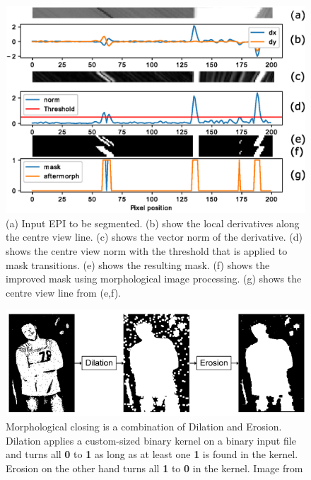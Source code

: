 \documentclass  [
  paper    = a4,
  BCOR     = 10mm,
  twoside,
  fontsize = 12pt,
  fleqn,
  toc      = bibnumbered,
  toc      = listofnumbered,
  numbers  = noendperiod,
  headings = normal,
  listof   = leveldown,
  version  = 3.03
]                                       {scrreprt}
\begin{document}
\begin{figure}
	\centering
	\includegraphics[width=1\linewidth]{images/derivatives_full}
	\caption[Segmenting an EPI]{(a) Input EPI to be segmented. (b) show the local derivatives along the centre view line. (c) shows the vector norm of the derivative. (d) shows the centre view norm with the threshold that is applied to mask transitions. (e) shows the resulting mask. (f) shows the improved mask using morphological image processing. (g) shows the centre view line from (e,f). }
	\label{fig:derivativesfull}

\end{figure}
\begin{figure}
	\centering
	\includegraphics[width=0.7\linewidth]{images/closing}
	\caption[Morphological closing]{Morphological closing is a combination of Dilation and Erosion. Dilation applies a custom-sized binary kernel on a binary input file and turns all \textbf{0} to \textbf{1} as long as at least one \textbf{1} is found in the kernel. Erosion on the other hand turns all \textbf{1} to \textbf{0} in the kernel. Image from \cite{what-when-how.com}}
	\label{fig:closing}
\end{figure}
\end{document}
